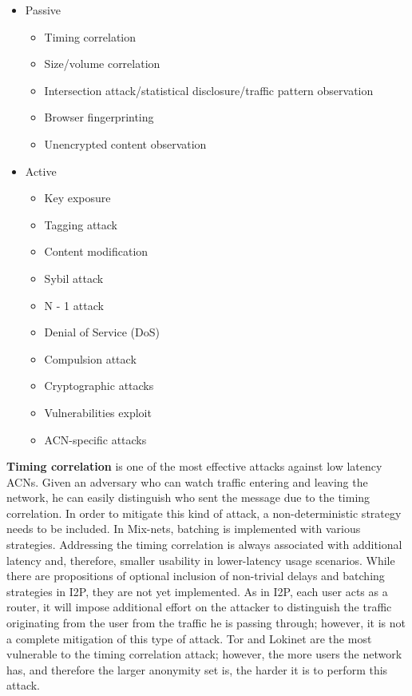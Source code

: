 \begin{itemize}
    \item Passive
    \begin{itemize}
        \item Timing correlation
        \item Size/volume correlation
        \item Intersection attack/statistical disclosure/traffic pattern observation
        \item Browser fingerprinting
        \item Unencrypted content observation
    \end{itemize}
    \item Active
    \begin{itemize}
        \item Key exposure
        \item Tagging attack
        \item Content modification
        \item Sybil attack
        \item N - 1 attack
        \item Denial of Service (DoS)
        \item Compulsion attack
        \item Cryptographic attacks
        \item Vulnerabilities exploit
        \item ACN-specific attacks
    \end{itemize}
\end{itemize}

\textbf{Timing correlation} is one of the most effective attacks against low latency ACNs. Given an adversary who can watch traffic entering and leaving the network, he can easily distinguish who sent the message due to the timing correlation. In order to mitigate this kind of attack, a non-deterministic strategy needs to be included. In Mix-nets, batching is implemented with various strategies. Addressing the timing correlation is always associated with additional latency and, therefore, smaller usability in lower-latency usage scenarios. While there are propositions of optional inclusion of non-trivial delays and batching strategies in I2P, they are not yet implemented. As in I2P, each user acts as a router, it will impose additional effort on the attacker to distinguish the traffic originating from the user from the traffic he is passing through; however, it is not a complete mitigation of this type of attack. Tor and Lokinet are the most vulnerable to the timing correlation attack; however, the more users the network has, and therefore the larger anonymity set is, the harder it is to perform this attack.

